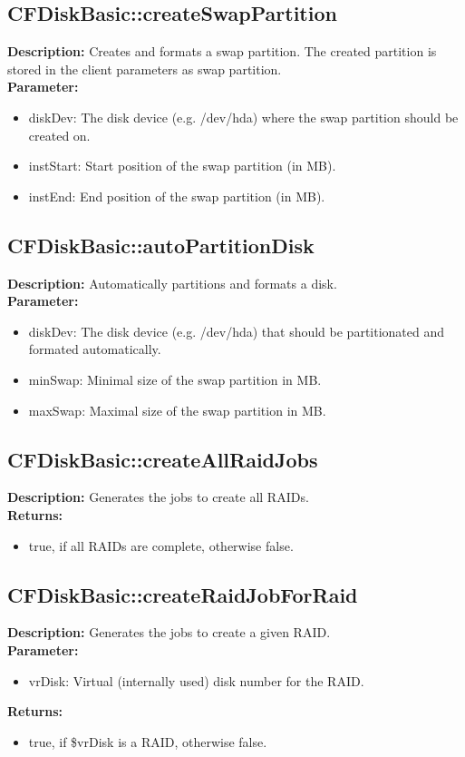 \subsection{CFDiskBasic::createSwapPartition}
\textbf{Description:} Creates and formats a swap partition. The created partition is stored in the client parameters as swap partition.\\
\textbf{Parameter:}
\begin{itemize}
\item diskDev: The disk device (e.g. /dev/hda) where the swap partition should be created on.
\item instStart: Start position of the swap partition (in MB).
\item instEnd: End position of the swap partition (in MB).
\end{itemize}

\subsection{CFDiskBasic::autoPartitionDisk}
\textbf{Description:} Automatically partitions and formats a disk.\\
\textbf{Parameter:}
\begin{itemize}
\item diskDev: The disk device (e.g. /dev/hda) that should be partitionated and formated automatically.
\item minSwap: Minimal size of the swap partition in MB.
\item maxSwap: Maximal size of the swap partition in MB.
\end{itemize}

\subsection{CFDiskBasic::createAllRaidJobs}
\textbf{Description:} Generates the jobs to create all RAIDs.\\
\textbf{Returns:}
\begin{itemize}
\item true, if all RAIDs are complete, otherwise false.
\end{itemize}

\subsection{CFDiskBasic::createRaidJobForRaid}
\textbf{Description:} Generates the jobs to create a given RAID.\\
\textbf{Parameter:}
\begin{itemize}
\item vrDisk: Virtual (internally used) disk number for the RAID.
\end{itemize}
\textbf{Returns:}
\begin{itemize}
\item true, if \$vrDisk is a RAID, otherwise false.
\end{itemize}

